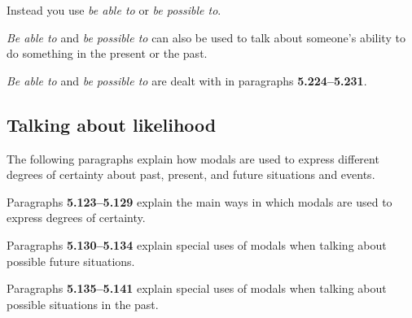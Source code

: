\documentclass[oneside]{book}
\numberwithin{equation}{section}
\begin{document}
Instead you use \textit{be able to} or \textit{be possible to}.

%
\textit{Be able to} and \textit{be possible to} can also be used to talk about someone's ability to do something in the present or the past.

%
\textit{Be able to} and \textit{be possible to} are dealt with in paragraphs \textbf{5.224--5.231}.

\subsection{Talking about likelihood}
\noindent{} The following paragraphs explain how modals are used to express different degrees of certainty about past, present, and future situations and events.

%
Paragraphs \textbf{5.123--5.129} explain the main ways in which modals are used to express degrees of certainty.

%
Paragraphs \textbf{5.130--5.134} explain special uses of modals when talking about possible future situations.

%
Paragraphs \textbf{5.135--5.141} explain special uses of modals when talking about possible situations in the past.
\end{document}
